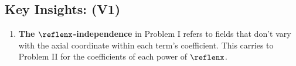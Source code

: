 \subsection{Key Insights: (V1)}

\begin{enumerate}
\def\labelenumi{\arabic{enumi}.}
\item
  \textbf{The \(\reflenx\)-independence} in Problem I refers to fields that
  don't vary with the axial coordinate within each term's coefficient.
  This carries to Problem II for the coefficients of each power of
  \(\reflenx\).
\end{enumerate}

